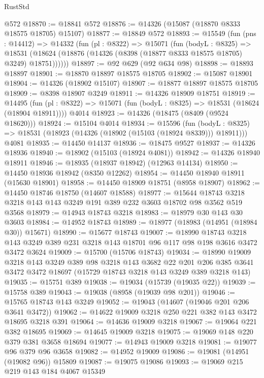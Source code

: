 \begin{lexlean}{RustStd}
\begin{coremodule}
    @572
@18870 := @18841 @572
@18876 := @14326 (@15087 (@18870 @8333 @18575 @18705) @15107)
@18877 := @18849 @572
@18893 := @15549
    (fun (pns : @14412) =>
    @14332
      (fun (pl : @8322) =>
      @15071
        (fun (bodyL : @8325) =>
        @18531 (@18624 (@18876 (@14326 (@8398 (@18877 @8333 @18575 @18705) @3249) @18751))))))
@18897 := @92 @629 (@92 @634 @98)
@18898 := @18893 @18897
@18901 := @18870 @18897 @18575 @18705
@18902 := @15087 @18901
@18904 := @14326 (@18902 @15107)
@18907 := @18877 @18897 @18575 @18705
@18909 := @8398 @18907 @3249
@18911 := @14326 @18909 @18751
@18919 := @14495
    (fun (pl : @8322) => @15071 (fun (bodyL : @8325) => @18531 (@18624 (@18904 @18911))))
    @4014
@18923 := @14326 (@18475 (@8409 (@9524 @18620)))
@18924 := @15104 @4014
@18934 := @15596
    (fun (bodyL : @8325) => @18531 (@18923 (@14326 (@18902 (@15103 (@18924 @8339))) @18911)))
    @4081
@18935 := @14450 @14137
@18936 := @18475 @9527
@18937 := @14326 @18936
@18940 := @18902 (@15103 (@18924 @4081))
@18942 := @14326 @18940 @18911
@18946 := @18935 (@18937 @18942) (@12963 @14134)
@18950 := @14450 @18936 @18942 (@8350 @12262)
@18954 := @14450 @18940 @18911 (@15630 @18901)
@18958 := @14450 @18909 @18751 (@8958 @18907)
@18962 := @14450 @18746 @18750 (@14607 @18588)
@18977 := @15644 @18743 @3218 @3218 @143 @143 @3249 @191 @389 @232 @3603 @18702 @98 @3562 @519 @3568
@18979 := @14943 @18743 @3218
@18983 := @18979 @30 @143 @30 @3603
@18984 := @14952 @18743
@18989 := @18977 (@18983 (@14951 (@18984 @30)) @15671)
@18990 := @15677 @18743
@19007 := @18990
    @18743
    @3218
    @143
    @3249
    @389
    @231
    @3218
    @143
    @18701
    @96
    @117
    @98
    @198
    @3616
    @3472
    @3472
    @3624
@19009 := @15700 (@15706 @18743)
@19034 := @18990
    @19009
    @3218
    @143
    @3249
    @389
    @98
    @3218
    @143
    @3682
    @22
    @201
    @206
    @385
    @3641
    @3472
    @3472
    @18697
    (@15729 @18743 @3218 @143 @3249 @389 @3218 @143)
@19035 := @15751 @389
@19038 := @19034 (@15739 (@19035 @22))
@19039 := @15758 @389
@19043 := @19038 (@8958 (@19039 @98 @201))
@19046 := @15765 @18743 @143 @3249
@19052 := @19043 (@14607 (@19046 @201 @206 @3641 @3472))
@19062 := @14622 @19009 @3218 @250 @221 @382 @143 @3472 @18695 @3218 @391
@19064 := @14636 @19009 @3218
@19067 := @19064 @221 @382 @18695
@19069 := @14645 @19009 @3218
@19075 := @19069 @148 @220 @379 @381 @3658 @18694
@19077 := @14943 @19009 @3218
@19081 := @19077 @96 @379 @96 @3658
@19082 := @14952 @19009
@19086 := @19081 (@14951 (@19082 @96)) @15809
@19087 := @19075 @19086
@19093 := @19069 @215 @219 @143 @184 @4067 @15349

\end{coremodule}
\end{lexlean}
